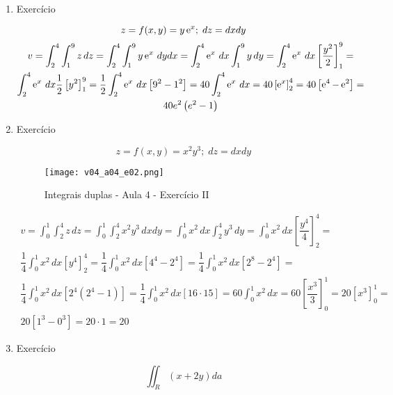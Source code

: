 \begin{enumerate}
	\item Exercício
	
	\begin{equation*}
		z = f(x, y) = y\operatorname{e}^x;\; dz = dx dy	
	\end{equation*}
	\begin{gather*}
		v = \int_2^4 \int_1^9 z\, dz = \int_2^4 \int_1^9 y\operatorname{e}^x\, dy dx = \int_2^4 \operatorname{e}^x\, dx \int_1^9 y\, dy = \int_2^4 \operatorname{e}^x\, dx \left[\dfrac{y^2}{2}\right]_1^9 =\\ \int_2^4 \operatorname{e}^x\, dx \dfrac{1}{2}\left[y^2\right]_1^9 = \dfrac{1}{2}\int_2^4 \operatorname{e}^x\, dx \left[9^2 - 1^2\right] = 40\int_2^4 \operatorname{e}^x\, dx = 40\left[\operatorname{e}^x\right]_2^4 = 40\left[\operatorname{e}^4 - \operatorname{e}^2\right] =\\ 40e^2\left(e^2 - 1\right)	
	\end{gather*}
	
	\item Exercício
	
	\begin{equation*}
		z = f(x,y) = x^2y^3;\; dz = dx dy
	\end{equation*}
	
	\begin{figure}[htb]
		\caption{Integrais duplas - Aula 4 - Exercício II}
		\label{v04_a04_e02}
		\centering
		\texttt{[image: v04\_a04\_e02.png]}		
	\end{figure}
	
	\begin{gather*}
		v = \int_0^1 \int_2^4 z\, dz = \int_0^1 \int_2^4 x^2y^3\, dx dy = \int_0^1 x^2\, dx \int_2^4 y^3\, dy = \int_0^1 x^2\, dx \left[\dfrac{y^4}{4}\right]_2^4 =\\ \dfrac{1}{4}\int_0^1 x^2\, dx \left[y^4\right]_2^4 = \dfrac{1}{4}\int_0^1 x^2\, dx \left[4^4 - 2^4\right] = \dfrac{1}{4}\int_0^1 x^2\, dx \left[2^8 - 2^4\right] =\\ \dfrac{1}{4}\int_0^1 x^2\, dx \left[2^4\left(2^4 - 1\right)\right] = \dfrac{1}{4}\int_0^1 x^2\, dx \left[16 \cdot 15\right] = 60\int_0^1 x^2\, dx = 60 \left[\dfrac{x^3}{3}\right]_0^1 = 20 \left[x^3\right]_0^1 =\\ 20 \left[1^3 - 0^3\right] = 20 \cdot 1 =  20
	\end{gather*}
	
	\item Exercício
	
	\begin{equation*}
		\iint_R (x + 2y) da
	\end{equation*}
	

\end{enumerate}
